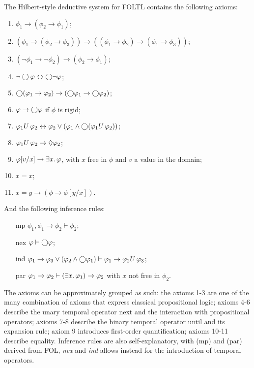 \begin{definition}\label{def:axioms}
  The Hilbert-style deductive system for \ac{FOLTL} contains the following axioms:
  \begin{enumerate}
    \item $\phi_1 \to (\phi_2 \to \phi_1)$;
    \item $(\phi_1 \to (\phi_2 \to \phi_3)) \to ((\phi_1 \to \phi_2) \to (\phi_1 \to \phi_3))$;
    \item $(\neg\phi_1 \to \neg\phi_2) \to (\phi_2 \to \phi_1)$;
    \item $\neg\bigcirc{\varphi} \leftrightarrow \bigcirc{\neg\varphi}$;
    \item $\bigcirc{(\varphi_1 \to \varphi_2)} \to (\bigcirc{\varphi_1} \to \bigcirc{\varphi_2})$;
    \item $\varphi \to \bigcirc{\varphi}$ if $\phi$ is rigid;
    \item ${\varphi_1}U\,{\varphi_2} \leftrightarrow \varphi_2 \lor (\varphi_1 \land \bigcirc{({\varphi_1}U\,{\varphi_2})})$;
    \item ${\varphi_1}U\,{\varphi_2} \to \Diamond{\varphi_2}$;
    \item $\varphi[v/x] \to \exists {x} \ldotp {\varphi}$, with $x$ free in $\phi$ and $v$ a value in the domain;
    \item $x = x$;
    \item $x = y \to (\phi \to \phi[y/x])$.
  \end{enumerate}
  And the following inference rules:
  \begin{enumerate}
    \item[mp] $\phi_1, \phi_1 \to \phi_2 \vdash \phi_2$;
    \item[nex] $\varphi \vdash \bigcirc{\varphi}$;
    \item[ind] $\varphi_1 \to \varphi_3 \lor (\varphi_2 \land \bigcirc{\varphi_1}) \vdash \varphi_1 \to {\varphi_2}U\,{\varphi_3}$;
    \item[par] $\varphi_1 \to \varphi_2 \vdash (\exists {x} \ldotp {\varphi_1}) \to \varphi_2$ with $x$ not free in $\phi_2$.
  \end{enumerate}
\end{definition}

The axioms can be approximately grouped as such: the axioms 1-3 are one of the many combination of axioms that express
classical propositional logic; axioms 4-6 describe the unary temporal operator next and the interaction with
propositional operators; axioms 7-8 describe the binary temporal operator until and its expansion rule; axiom 9
introduces first-order quantification; axioms 10-11 describe equality. Inference rules are also self-explanatory, with
(mp) and (par) derived from \ac{FOL}, \emph{nex} and \emph{ind} allows instead for the introduction of temporal operators.

